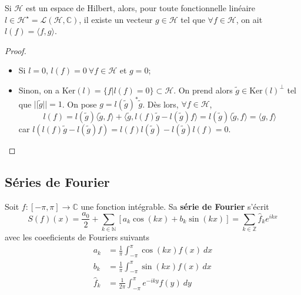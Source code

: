 \begin{lemme}[Riesz]
    Si $\mathcal{H}$ est un espace de Hilbert, alors, pour toute fonctionnelle linéaire $l\in\mathcal{H}^\star=\mathcal{L}(\mathcal{H},\mathbb{C})$, il existe un vecteur $g\in\mathcal{H}$ tel que $\forall f\in\mathcal{H}$, on ait $l(f)=\langle f,g\rangle$.
\end{lemme}
\begin{proof}
    \begin{itemize}
        \item Si $l=0$, $l(f)=0 \ \forall f \in \mathcal{H}$ et $g=0$;
        \item Sinon, on a $\text{Ker}(l)=\{f\big|l(f)=0\}\subset \mathcal{H}$. On prend alors $\widetilde{g}\in\text{Ker}(l)^\bot$ tel que $||\widetilde{g}||=1$. On pose $g = l(\widetilde{g})^*\widetilde{g}$. Dès lors, $ \forall f\in\mathcal{H}$,
        \begin{equation*}
            l(f) = l(\widetilde{g})\langle \widetilde{g},f\rangle+\langle\widetilde{g},l(f)\widetilde{g}-l(\widetilde{g})f\rangle = l(\widetilde{g})\langle\widetilde{g},f\rangle=\langle g,f\rangle
        \end{equation*}
        car $l(l(f)\widetilde{g}-l(\widetilde{g})f)=l(f)l(\widetilde{g})-l(\widetilde{g})l(f)=0$.
    \end{itemize}
\end{proof}

\subsection{Séries de Fourier}

\begin{definition}
    Soit $f:[-\pi,\pi]\to\mathbb{C}$ une fonction intégrable. Sa \textbf{série de Fourier} s'écrit
    \begin{equation*}
        S(f)(x) = \frac{a_0}{2} + \sum_{k\in\mathbb{N}}[a_k\cos(kx)+b_k\sin(kx)] = \sum_{k\in\mathbb{Z}}\hat{f}_ke^{ikx}
    \end{equation*}
    avec les coeeficients de Fouriers suivants
    \begin{align*}
        a_k & = \frac{1}{\pi}\int_{-\pi}^\pi \cos(kx)f(x) \ dx\\
        b_k & = \frac{1}{\pi}\int_{-\pi}^\pi \sin(kx)f(x) \ dx\\
        \hat{f}_k & = \frac{1}{2\pi}\int_{-\pi}^\pi e^{-iky}f(y) \ dy
    \end{align*}
\end{definition}

